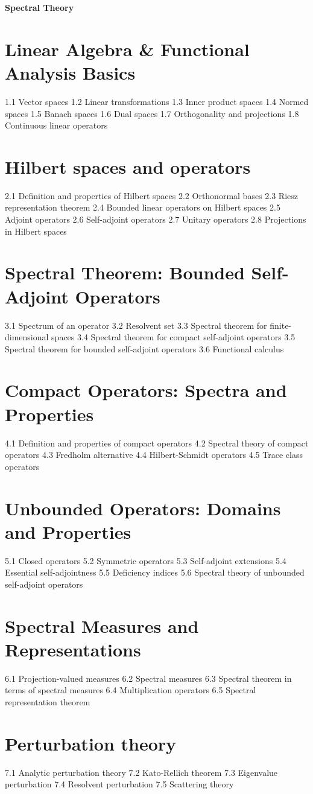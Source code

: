 {\LARGE \bf{Spectral Theory}}
\section{Linear Algebra \& Functional Analysis Basics}
1.1 Vector spaces
1.2 Linear transformations
1.3 Inner product spaces
1.4 Normed spaces
1.5 Banach spaces
1.6 Dual spaces
1.7 Orthogonality and projections
1.8 Continuous linear operators
\section{Hilbert spaces and operators}
2.1 Definition and properties of Hilbert spaces
2.2 Orthonormal bases
2.3 Riesz representation theorem
2.4 Bounded linear operators on Hilbert spaces
2.5 Adjoint operators
2.6 Self-adjoint operators
2.7 Unitary operators
2.8 Projections in Hilbert spaces
\section{Spectral Theorem: Bounded Self-Adjoint Operators}
3.1 Spectrum of an operator
3.2 Resolvent set
3.3 Spectral theorem for finite-dimensional spaces
3.4 Spectral theorem for compact self-adjoint operators
3.5 Spectral theorem for bounded self-adjoint operators
3.6 Functional calculus
\section{Compact Operators: Spectra and Properties}
4.1 Definition and properties of compact operators
4.2 Spectral theory of compact operators
4.3 Fredholm alternative
4.4 Hilbert-Schmidt operators
4.5 Trace class operators
\section{Unbounded Operators: Domains and Properties}
5.1 Closed operators
5.2 Symmetric operators
5.3 Self-adjoint extensions
5.4 Essential self-adjointness
5.5 Deficiency indices
5.6 Spectral theory of unbounded self-adjoint operators
\section{Spectral Measures and Representations}
6.1 Projection-valued measures
6.2 Spectral measures
6.3 Spectral theorem in terms of spectral measures
6.4 Multiplication operators
6.5 Spectral representation theorem
\section{Perturbation theory}
7.1 Analytic perturbation theory
7.2 Kato-Rellich theorem
7.3 Eigenvalue perturbation
7.4 Resolvent perturbation
7.5 Scattering theory
